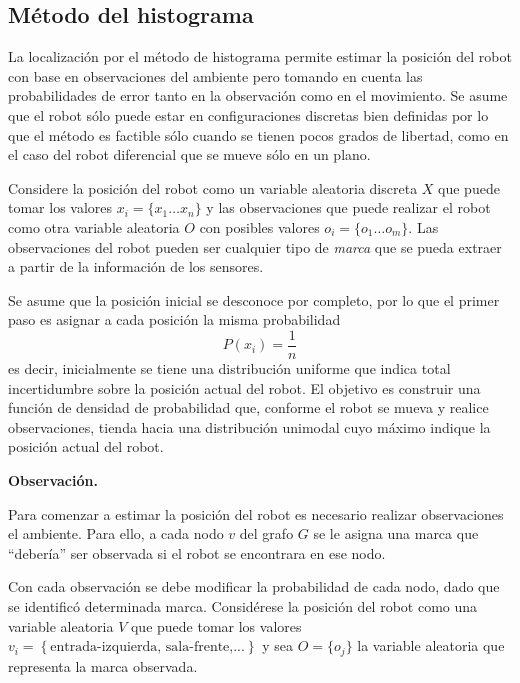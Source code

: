 \documentclass[a4paper]{article}
\newcommand\ddfrac[2]{\frac{\displaystyle #1}{\displaystyle #2}}
\begin{document}
\subsection{Método del histograma}
La localización por el método de histograma permite estimar la posición del robot con base en observaciones del ambiente pero tomando en cuenta las probabilidades de error tanto en la observación como en el movimiento. Se asume que el robot sólo puede estar en configuraciones discretas bien definidas por lo que el método es factible sólo cuando se tienen pocos grados de libertad, como en el caso del robot diferencial que se mueve sólo en un plano. 

Considere la posición del robot como un variable aleatoria discreta $X$ que puede tomar los valores $x_i=\{x_1 \dots x_n\}$ y las observaciones que puede realizar el robot como otra variable aleatoria $O$ con posibles valores $o_i=\{o_1 \dots o_m\}$. Las observaciones del robot pueden ser cualquier tipo de \textit{marca} que se pueda extraer a partir de la información de los sensores. 

Se asume que la posición inicial se desconoce por completo, por lo que el primer paso es asignar a cada posición la misma probabilidad
\begin{equation}
P(x_i) = \ddfrac{1}{n}
\end{equation}
es decir, inicialmente se tiene una distribución uniforme que indica total incertidumbre sobre la posición actual del robot. El objetivo es construir una función de densidad de probabilidad que, conforme el robot se mueva y realice observaciones, tienda hacia una distribución unimodal cuyo máximo indique la posición actual del robot.

\textbf{Observación.} 

Para comenzar a estimar la posición del robot es necesario realizar observaciones el ambiente. Para ello, a cada nodo $v$ del grafo $G$ se le asigna una marca que ``debería'' ser observada si el robot se encontrara en ese nodo. 

Con cada observación se debe modificar la probabilidad de cada nodo, dado que se identificó determinada marca. Considérese la posición del robot como una variable aleatoria $V$ que puede tomar los valores $v_i =\left\{\textrm{entrada-izquierda, sala-frente,...}\right\}$ y sea $O = \{o_j\}$ la variable aleatoria que representa la marca observada.
\end{document}
